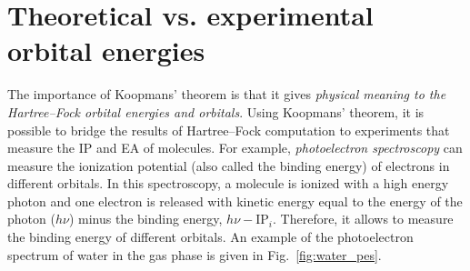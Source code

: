\documentclass[../Main/notes.tex]{subfiles}
\begin{document}
\section{Theoretical vs. experimental orbital energies}

The importance of Koopmans' theorem is that it gives \emph{physical meaning to the Hartree--Fock orbital energies and orbitals}.
Using Koopmans' theorem, it is possible to bridge the results of Hartree--Fock computation to experiments that measure the IP and EA of molecules.
For example, \emph{photoelectron spectroscopy} can measure the ionization potential (also called the binding energy) of electrons in different orbitals.
In this spectroscopy, a molecule is ionized with a high energy photon and one electron is released with kinetic energy equal to the energy of the photon ($h \nu$) minus the binding energy, $h \nu - \mathrm{IP}_i$.
Therefore, it allows to measure the binding energy of different orbitals.
An example of the photoelectron spectrum of water in the gas phase is given in Fig.~\ref{fig:water_pes}.
\end{document}
